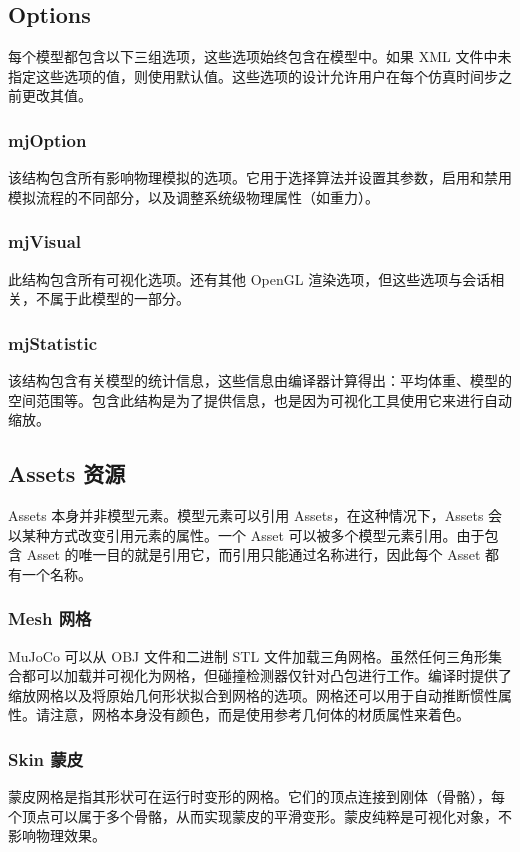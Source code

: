 \subsection{Options}
每个模型都包含以下三组选项，这些选项始终包含在模型中。如果 XML 文件中未指定这些选项的值，则使用默认值。这些选项的设计允许用户在每个仿真时间步之前更改其值。

\subsubsection{mjOption}
该结构包含所有影响物理模拟的选项。它用于选择算法并设置其参数，启用和禁用模拟流程的不同部分，以及调整系统级物理属性（如重力）。

\subsubsection{mjVisual}
此结构包含所有可视化选项。还有其他 OpenGL 渲染选项，但这些选项与会话相关，不属于此模型的一部分。

\subsubsection{mjStatistic}
该结构包含有关模型的统计信息，这些信息由编译器计算得出：平均体重、模型的空间范围等。包含此结构是为了提供信息，也是因为可视化工具使用它来进行自动缩放。

\subsection{Assets 资源}
Assets 本身并非模型元素。模型元素可以引用 Assets，在这种情况下，Assets 会以某种方式改变引用元素的属性。一个 Asset 可以被多个模型元素引用。由于包含 Asset 的唯一目的就是引用它，而引用只能通过名称进行，因此每个 Asset 都有一个名称。

\subsubsection{Mesh 网格}
MuJoCo 可以从 OBJ 文件和二进制 STL 文件加载三角网格。虽然任何三角形集合都可以加载并可视化为网格，但碰撞检测器仅针对凸包进行工作。编译时提供了缩放网格以及将原始几何形状拟合到网格的选项。网格还可以用于自动推断惯性属性。请注意，网格本身没有颜色，而是使用参考几何体的材质属性来着色。

\subsubsection{Skin 蒙皮}
蒙皮网格是指其形状可在运行时变形的网格。它们的顶点连接到刚体（骨骼），每个顶点可以属于多个骨骼，从而实现蒙皮的平滑变形。蒙皮纯粹是可视化对象，不影响物理效果。

